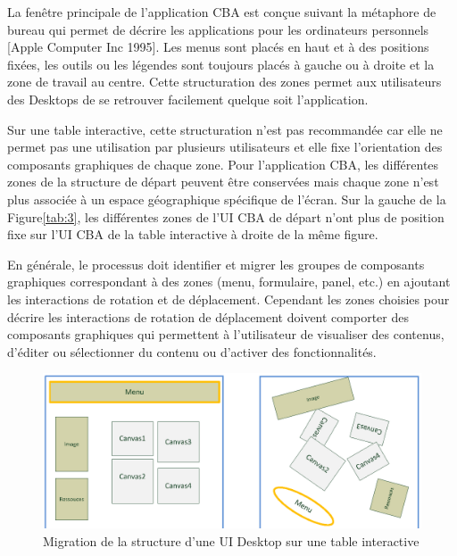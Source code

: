 La fenêtre principale de l'application CBA est conçue suivant la métaphore de bureau  qui permet de décrire les applications pour les ordinateurs personnels [Apple Computer Inc 1995]. Les menus sont placés en haut et à des positions fixées, les outils ou les légendes sont toujours placés à gauche ou à droite et la zone de travail au centre. Cette structuration des zones permet aux utilisateurs des Desktops de se retrouver  facilement quelque soit l'application.

Sur une table interactive, cette structuration n'est pas recommandée car elle ne permet pas une utilisation par plusieurs utilisateurs et elle fixe l'orientation des composants graphiques de chaque zone. Pour l'application CBA, les différentes zones de la structure de départ peuvent être conservées mais chaque zone n'est plus associée à un espace géographique spécifique de l'écran. Sur la gauche de la Figure\ref{tab:3}, les différentes zones de l'UI CBA de départ n'ont plus de position fixe sur l'UI CBA de la table interactive à droite de la même figure.

En générale, le processus doit identifier et migrer les groupes de composants graphiques correspondant à des zones (menu, formulaire, panel, etc.) en ajoutant les interactions de rotation et de déplacement. Cependant les zones choisies pour décrire les interactions de rotation de déplacement doivent comporter des composants graphiques qui permettent à l'utilisateur de visualiser des contenus, d'éditer ou sélectionner du contenu ou d'activer des fonctionnalités.

\begin{figure}[h]
\begin{center}
\includegraphics[width=432pt]{chap1/img-2}
\caption{Migration de la structure d'une UI Desktop sur une table interactive}\label{fig:2}
\end{center}
\end{figure}

